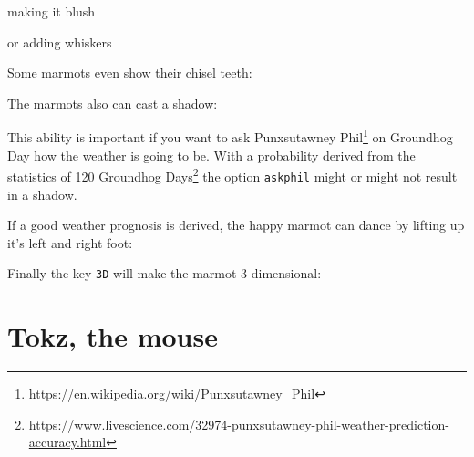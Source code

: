 \documentclass[parskip=half]{scrartcl}
\begin{document}
\begin{tcblisting}{}
\marmot[body=SteelBlue]
\end{tcblisting}

making it blush

\begin{tcblisting}{}
\marmot[blush]
\end{tcblisting}

or adding whiskers

\begin{tcblisting}{}
\marmot[whiskers=gray]
\end{tcblisting}

Some marmots even show their chisel teeth:

\begin{tcblisting}{}
\marmot[teeth=white]
\end{tcblisting}

The marmots also can cast a shadow:

\begin{tcblisting}{}
\marmot[shadow]
\end{tcblisting}

This ability is important if you want to ask Punxsutawney Phil\footnote{\url{https://en.wikipedia.org/wiki/Punxsutawney_Phil}} on Groundhog Day how the weather is going to be. With a probability derived from the statistics of 120 Groundhog Days\footnote{\url{https://www.livescience.com/32974-punxsutawney-phil-weather-prediction-accuracy.html}} the option \lstinline|askphil| might or might not result in a shadow.

\begin{tcblisting}{}
\marmot[askphil]
\end{tcblisting}

If a good weather prognosis is derived, the happy marmot can dance by lifting up it's left and right foot: 

\begin{tcblisting}{}
\marmot[leftstep]
\marmot[rightstep,xshift=2cm]
\end{tcblisting}

Finally the key \lstinline|3D| will make the marmot 3-dimensional:

\begin{tcblisting}{}
\marmot[3D]
\end{tcblisting}


\clearpage
\section[Mouse]{Tokz, the mouse}
\end{document}
